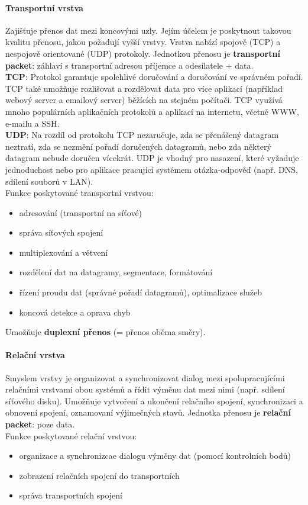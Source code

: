 \documentclass[10pt,a4paper]{article}
\begin{document}
\paragraph{Transportní vrstva} Zajišťuje přenos dat mezi koncovými uzly. Jejím účelem je poskytnout takovou kvalitu přenosu, jakou požadují vyšší vrstvy. Vrstva nabízí spojově (TCP) a nespojově orientované (UDP) protokoly. Jednotkou přenosu je \textbf{transportní packet}: záhlaví s transportní adresou příjemce a odesílatele + data. \\
\textbf{TCP}: Protokol garantuje spolehlivé doručování a doručování ve správném pořadí. TCP také umožňuje rozlišovat a rozdělovat data pro více aplikací (například webový server a emailový server) běžících na stejném počítači. TCP využívá mnoho populárních aplikačních protokolů a aplikací na internetu, včetně WWW, e-mailu a SSH. \\
\textbf{UDP}: Na rozdíl od protokolu TCP nezaručuje, zda se přenášený datagram neztratí, zda se nezmění pořadí doručených datagramů, nebo zda některý datagram nebude doručen vícekrát. UDP je vhodný pro nasazení, které vyžaduje jednoduchost nebo pro aplikace pracující systémem otázka-odpověď (např. DNS, sdílení souborů v LAN). \\
Funkce poskytované transportní vrstvou:
\begin{itemize}
	\item adresování (transportní na síťové)
	\item správa síťových spojení
	\item multiplexování a větvení
	\item rozdělení dat na datagramy, segmentace, formátování
	\item řízení proudu dat (správné pořadí datagramů), optimalizace služeb
	\item koncová detekce a oprava chyb
\end{itemize}
Umožňuje \textbf{duplexní přenos} (= přenos oběma směry).
\paragraph{Relační vrstva} Smyslem vrstvy je organizovat a synchronizovat dialog mezi spolupracujícími relačními vrstvami obou systémů a řídit výměnu dat mezi nimi (např. sdílení síťového disku). Umožňuje vytvoření a ukončení relačního spojení, synchronizaci a obnovení spojení, oznamovaní výjimečných stavů. Jednotka přenosu je \textbf{relační packet}: poze data. \\
Funkce poskytované relační vrstvou:
\begin{itemize}
	\item organizace a synchronizcae dialogu výměny dat (pomocí kontrolních bodů)
	\item zobrazení relačních spojení do transportních
	\item správa transportních spojení
\end{itemize}
\end{document}
